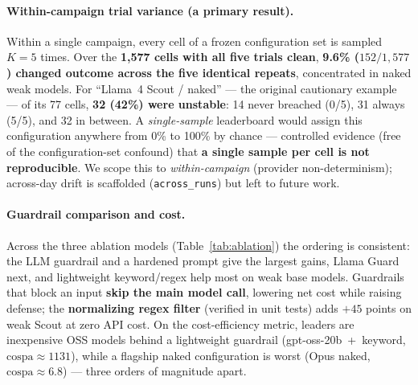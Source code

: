 \documentclass[11pt]{article}
\newcommand{\code}[1]{\texttt{#1}}
\begin{document}
\paragraph{Within-campaign trial variance (a primary result).}
Within a single campaign, every cell of a frozen configuration set is sampled
\textbf{$K=5$} times. Over the \textbf{1{,}577 cells with all five trials clean},
\textbf{9.6\% ($152/1{,}577$) changed outcome across the five identical repeats},
concentrated in naked weak models. For
``Llama~4 Scout / naked'' --- the original cautionary example --- of its 77 cells,
\textbf{32 (42\%) were unstable}: 14 never breached (0/5), 31 always (5/5), and 32
in between. A \emph{single-sample} leaderboard would assign this configuration
anywhere from 0\% to 100\% by chance --- controlled evidence (free of the
configuration-set confound) that \textbf{a single sample per cell is not
reproducible}. We scope this to \emph{within-campaign} (provider non-determinism);
across-day drift is scaffolded (\code{across\_runs}) but left to future work.

\paragraph{Guardrail comparison and cost.}
Across the three ablation models (Table~\ref{tab:ablation}) the ordering is
consistent: the LLM guardrail and a hardened prompt give the largest gains, Llama
Guard next, and lightweight keyword/regex help most on weak base models. Guardrails
that block an input \textbf{skip the main model call}, lowering net cost while
raising defense; the \textbf{normalizing regex filter} (verified in unit tests)
adds $+45$ points on weak Scout at zero API cost. On the cost-efficiency metric,
leaders are inexpensive OSS models behind a lightweight guardrail
(gpt-oss-20b~+~keyword, $\mathrm{cospa}\approx1131$), while a flagship naked
configuration is worst (Opus naked, $\mathrm{cospa}\approx6.8$) --- three orders of
magnitude apart.
\end{document}
